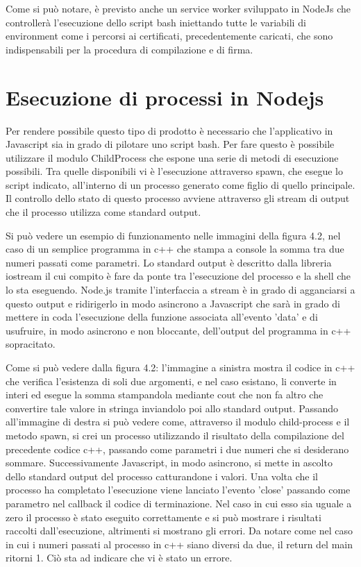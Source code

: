 Come si può notare, è previsto anche un service worker sviluppato in NodeJs che controllerà l’esecuzione dello script bash iniettando tutte le variabili di environment come i percorsi ai certificati, precedentemente caricati, che sono indispensabili per la procedura di compilazione e di firma.\vspace{5mm}

\section{Esecuzione di processi in Nodejs}\vspace{5mm}

Per rendere possibile questo tipo di prodotto è necessario che l'applicativo in Javascript sia in grado di pilotare uno script bash. Per fare questo è possibile utilizzare il modulo ChildProcess\cite{ChildProcess} che espone una serie di metodi di esecuzione possibili. Tra quelle disponibili vi è l'esecuzione attraverso spawn, che esegue lo script indicato, all'interno di un processo generato come figlio di quello principale. Il controllo dello stato di questo processo avviene attraverso gli stream di output che il processo utilizza come standard output. \vspace{5mm}

Si può vedere un esempio di funzionamento nelle immagini della figura 4.2, nel caso di un semplice programma in c++ che stampa a console la somma tra due numeri passati come parametri. Lo standard output è descritto dalla libreria iostream il cui compito è fare da ponte tra l'esecuzione del processo e la shell che lo sta eseguendo. Node.js tramite l'interfaccia a stream è in grado di agganciarsi a questo output e ridirigerlo in modo asincrono a Javascript che sarà in grado di mettere in coda l'esecuzione della funzione associata all'evento 'data' e di usufruire, in modo asincrono e non bloccante, dell'output del programma in c++ sopracitato.\vspace{5mm}

Come si può vedere dalla figura 4.2: l'immagine a sinistra mostra il codice in c++ che verifica l'esistenza di soli due argomenti, e nel caso esistano, li converte in interi ed esegue la somma stampandola mediante cout che non fa altro che convertire tale valore in stringa inviandolo poi allo standard output. Passando all'immagine di destra si può vedere come, attraverso il modulo child-process e il metodo spawn, si crei un processo utilizzando il risultato della compilazione del precedente codice c++, passando come parametri i due numeri che si desiderano sommare. Successivamente Javascript, in modo asincrono, si mette in ascolto dello standard output del processo catturandone i valori. Una volta che il processo ha completato l'esecuzione viene lanciato l'evento 'close' passando come parametro nel callback il codice di terminazione. Nel caso in cui esso sia uguale a zero il processo è stato eseguito correttamente e si può mostrare i risultati raccolti dall'esecuzione, altrimenti si mostrano gli errori. Da notare come nel caso in cui i numeri passati al processo in c++ siano diversi da due, il return del main ritorni 1. Ciò sta ad indicare che vi è stato un errore.\vspace{5mm}

